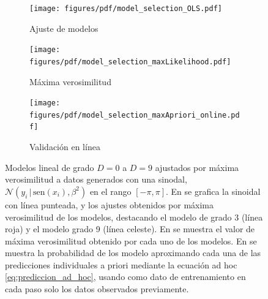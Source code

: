 \documentclass[a4paper,11pt]{book}
\newcommand{\N}{\mathcal{N}}
\theoremstyle{definition}
\begin{document}
\begin{figure}[ht!] \centering
  \begin{subfigure}[t]{0.32\textwidth}
  \centering
  \texttt{[image: figures/pdf/model\_selection\_OLS.pdf]}
  \caption{Ajuste de modelos}
  \label{fig:model_selection_OLS}
  \end{subfigure}
  \begin{subfigure}[t]{0.32\textwidth}
  \centering
  \texttt{[image: figures/pdf/model\_selection\_maxLikelihood.pdf]}
  \caption{M\'axima verosimilitud}
  \label{fig:model_selection_maxLikelihood}
  \end{subfigure}
  \begin{subfigure}[t]{0.32\textwidth}
  \centering
  \texttt{[image: figures/pdf/model\_selection\_maxApriori\_online.pdf]}
  \caption{Validaci\'on en l\'inea}
  \label{fig:model_selection_maxApriori_online}
  \end{subfigure}
  \caption{Modelos lineal de grado $D=0$ a $D=9$ ajustados por m\'axima verosimilitud a datos generados con una sinodal, $\N(y_i \,| \, \text{sen}(x_i), \beta^2)$ en el rango $[-\pi,\pi]$.
  En  se grafica la sinoidal con l\'inea punteada, y los ajustes obtenidos por m\'axima verosimilitud de los modelos, destacando el modelo de grado 3 (l\'inea roja) y el modelo grado 9 (l\'inea celeste).
  En  se muestra el valor de m\'axima verosimilitud obtenido por cada uno de los modelos.
  En  se muestra la probabilidad de los modelo aproximando cada una de las predicciones individuales a priori mediante la ecuaci\'on ad hoc \eqref{eq:prediccion_ad_hoc}, usando como dato de entrenamiento en cada paso solo los datos observados previamente.
   }
  \label{fig:overfitting}
\end{figure}

\end{document}
